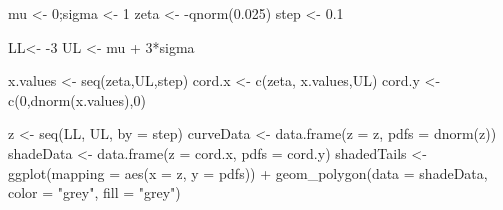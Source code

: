 \documentclass[
]{book}
\newenvironment{Shaded}{\begin{snugshade}}{\end{snugshade}}
\newcommand{\AttributeTok}[1]{\textcolor[rgb]{0.77,0.63,0.00}{#1}}
\newcommand{\DecValTok}[1]{\textcolor[rgb]{0.00,0.00,0.81}{#1}}
\newcommand{\FloatTok}[1]{\textcolor[rgb]{0.00,0.00,0.81}{#1}}
\newcommand{\FunctionTok}[1]{\textcolor[rgb]{0.00,0.00,0.00}{#1}}
\newcommand{\NormalTok}[1]{#1}
\newcommand{\OtherTok}[1]{\textcolor[rgb]{0.56,0.35,0.01}{#1}}
\newcommand{\SpecialCharTok}[1]{\textcolor[rgb]{0.00,0.00,0.00}{#1}}
\newcommand{\StringTok}[1]{\textcolor[rgb]{0.31,0.60,0.02}{#1}}
\begin{document}
\begin{Shaded}
\begin{Highlighting}[]
\NormalTok{mu }\OtherTok{\textless{}{-}} \DecValTok{0}\NormalTok{;sigma }\OtherTok{\textless{}{-}} \DecValTok{1}
\NormalTok{zeta }\OtherTok{\textless{}{-}} \SpecialCharTok{{-}}\FunctionTok{qnorm}\NormalTok{(}\FloatTok{0.025}\NormalTok{)}
\NormalTok{step }\OtherTok{\textless{}{-}} \FloatTok{0.1}

\NormalTok{LL}\OtherTok{\textless{}{-}} \SpecialCharTok{{-}}\DecValTok{3}
\NormalTok{UL }\OtherTok{\textless{}{-}}\NormalTok{ mu }\SpecialCharTok{+} \DecValTok{3}\SpecialCharTok{*}\NormalTok{sigma}

\NormalTok{x.values }\OtherTok{\textless{}{-}} \FunctionTok{seq}\NormalTok{(zeta,UL,step)}
\NormalTok{cord.x }\OtherTok{\textless{}{-}} \FunctionTok{c}\NormalTok{(zeta, x.values,UL) }
\NormalTok{cord.y }\OtherTok{\textless{}{-}} \FunctionTok{c}\NormalTok{(}\DecValTok{0}\NormalTok{,}\FunctionTok{dnorm}\NormalTok{(x.values),}\DecValTok{0}\NormalTok{) }

\NormalTok{z }\OtherTok{\textless{}{-}} \FunctionTok{seq}\NormalTok{(LL, UL, }\AttributeTok{by =}\NormalTok{ step)}
\NormalTok{curveData }\OtherTok{\textless{}{-}} \FunctionTok{data.frame}\NormalTok{(}\AttributeTok{z =}\NormalTok{ z, }\AttributeTok{pdfs =} \FunctionTok{dnorm}\NormalTok{(z))}
\NormalTok{shadeData }\OtherTok{\textless{}{-}} \FunctionTok{data.frame}\NormalTok{(}\AttributeTok{z =}\NormalTok{ cord.x, }\AttributeTok{pdfs =}\NormalTok{ cord.y)}
\NormalTok{shadedTails }\OtherTok{\textless{}{-}} \FunctionTok{ggplot}\NormalTok{(}\AttributeTok{mapping =} \FunctionTok{aes}\NormalTok{(}\AttributeTok{x =}\NormalTok{ z, }\AttributeTok{y =}\NormalTok{ pdfs))  }\SpecialCharTok{+} 
  \FunctionTok{geom\_polygon}\NormalTok{(}\AttributeTok{data =}\NormalTok{ shadeData, }\AttributeTok{color =} \StringTok{"grey"}\NormalTok{, }\AttributeTok{fill =} \StringTok{"grey"}\NormalTok{)}


\end{Highlighting}
\end{Shaded}
\end{document}
